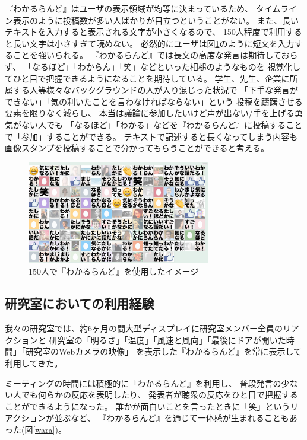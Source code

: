 『わかるらんど』はユーザの表示領域が均等に決まっているため、
タイムライン表示のように投稿数が多い人ばかりが目立つということがない。
また、長いテキストを入力すると表示される文字が小さくなるので、
150人程度で利用すると長い文字は小さすぎて読めない。
必然的にユーザは図\ref{wakaruland150}のように短文を入力することを強いられる。
『わかるらんど』では長文の高度な発言は期待しておらず、
「なるほど」「わからん」「笑」などといった相槌のようなものを
視覚化してひと目で把握できるようになることを期待している。
学生、先生、企業に所属する人等様々なバックグラウンドの人が入り混じった状況で
「下手な発言ができない」「気の利いたことを言わなければならない」という
投稿を躊躇させる要素を限りなく減らし、
本当は議論に参加したいけど声が出ない/手を上げる勇気がない人でも
「なるほど」「わかる」などを『わかるらんど』に投稿することで「参加」することができる。
テキストで記述すると長くなってしまう内容も
画像スタンプを投稿することで分かってもらうことができると考える。


\begin{figure}[h]
\centering
\includegraphics[width=8cm]{images/wakaruland150.png}
\caption{150人で『わかるらんど』を使用したイメージ}
\label{wakaruland150}
\end{figure}

\subsection{研究室においての利用経験}
我々の研究室では、約6ヶ月の間大型ディスプレイに研究室メンバー全員のリアクションと
研究室の「明るさ」「温度」「風速と風向」「最後にドアが開いた時間」「研究室のWebカメラの映像」
を表示した『わかるらんど』を常に表示して利用してきた。

ミーティングの時間には積極的に『わかるらんど』を利用し、
普段発言の少ない人でも何らかの反応を表明したり、
発表者が聴衆の反応をひと目で把握することができるようになった。
誰かが面白いことを言ったときに「笑」というリアクションが並ぶなど、
『わかるらんど』を通じて一体感が生まれることもあった(図\ref{wara})。

